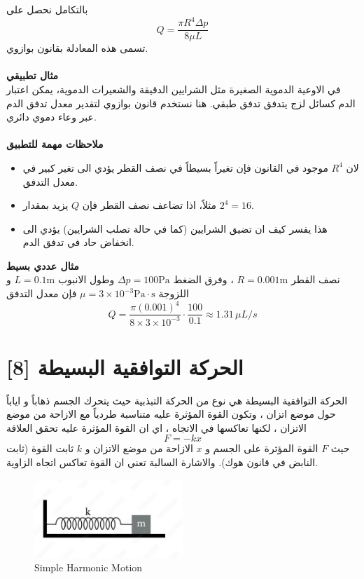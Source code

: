 بالتكامل نحصل على 
\[
Q = \frac{\pi R^4 \Delta p}{8 \mu L}
\]
تسمى هذه المعادلة بقانون بوازوي.\\ \\
\noindent
\textbf{مثال تطبيقي}\\
\noindent
في الاوعية الدموية الصغيرة مثل الشرايين الدقيقة والشعيرات الدموية، يمكن اعتبار الدم كسائل لزج يتدفق تدفق طبقي. هنا نستخدم قانون بوازوي لتقدير معدل تدفق الدم عبر وعاء دموي دائري.\\ \\
\noindent
\textbf{ملاحظات مهمة للتطبيق}
\begin{itemize}
	\item لان $R^4$ موجود في القانون فإن تغيراً بسيطاً في نصف القطر يؤدي الى تغير كبير في معدل التدفق.
	\item مثلاً، اذا تضاعف نصف القطر فإن $Q$ يزيد بمقدار $2^4 = 16$.
	\item  هذا يفسر كيف ان تضيق الشرايين (كما في حالة تصلب الشرايين) يؤدي الى انخفاض حاد في تدفق الدم.
\end{itemize}
\noindent
\textbf{مثال عددي بسيط}\\
نصف القطر $R = 0.001 \text{m}$ ، وفرق الضغط $\Delta p = 100 \text{Pa}$ وطول الانبوب $L = 0.1 \text{m}$ و اللزوجة $\mu = 3 \times 10^{-3} \text{Pa}\cdot \text{s}$ فإن معدل التدفق
\[
Q = \frac{\pi (0.001)^4}{8\times 3\times10^{-3}} \cdot \frac{100}{0.1} \approx 1.31 \, \mu L/s
\]

\section[الحركة التوافقية البسيطة \en{Simple Harmonic Motion}]{الحركة التوافقية البسيطة  [8]}
الحركة التوافقية البسيطة هي نوع من الحركة التبذبية حيث يتحرك الجسم ذهاباً و اياباً حول موضع اتزان ، وتكون القوة المؤثرة عليه متناسبة طردياً مع الازاحة من موضع الاتزان ، لكنها تعاكسها في الاتجاه ، اي  ان القوة المؤثرة عليه تحقق العلاقة 
\[
F = - k x
\]
حيث $F$ القوة المؤثرة على الجسم و $x$ الازاحة من موضع الاتزان و $k$ ثابت القوة (ثابت النابض في قانون هوك). والاشارة السالبة تعني ان القوة تعاكس اتجاه الزاوية.

\begin{english}
	\begin{figure}[ht]
		\centering
		\includegraphics[width=0.5\textwidth]{Figures/shm.jpg}
		\caption{Simple Harmonic Motion}
	\end{figure}
\end{english}

